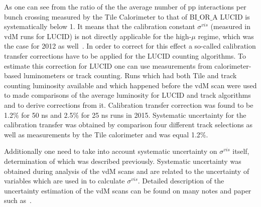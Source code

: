 As one can see from  the ratio of the the average number of pp interactions per bunch crossing
measured by the Tile Calorimeter to that of BI$\_$OR$\_$A LUCID is systematically below 1. 
It means that the calibration constant $\sigma^{vis}$ (measured in vdM runs for LUCID) is not directly applicable for the high-$\mu$ regime, 
which was the case for 2012 as well~\cite{Aaboud:2016hhf}.
In order to correct for this effect a so-called calibration transfer corrections have to be applied for the LUCID counting algorithms.
To estimate this correction for LUCID one can use measurements from calorimeter-based luminometers or track counting.
Runs which had both Tile and track counting luminosity available and which happened before the vdM scan were used to made comparisons of the average luminosity for LUCID and track algorithms
and to derive corrections from it. Calibration transfer correction was found to be 1.2$\%$ for 50 ns and 2.5$\%$ for 25 ns runs in 2015.
Systematic uncertainty for the calibration transfer was obtained by comparison four different track selections as well as measurements by the Tile calorimeter
and was equal 1.2$\%$.

Additionally one need to take into account systematic uncertainty on $\sigma^{vis}$ itself, determination of which was described previously.
Systematic uncertainty was obtained during analysis of the vdM scans and are related to the uncertainty of variables which are used in
 to calculate $\sigma^{vis}$. 
Detailed description of the uncertainty estimation of the vdM scans can be found on many notes and paper such 
as~\cite{ATLAS:2010uca,ATLAS-CONF-2011-011,ATLAS:2011cia,ATLAS:2012roa,Aad:2011dr,Aad:2013ucp,Aaboud:2016hhf}.


